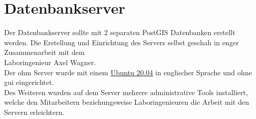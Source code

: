 \chapter{Datenbankserver}
Der Datenbankserver sollte mit 2 separaten PostGIS\cite{postgis:manual} Datenbanken erstellt werden. Die Erstellung und Einrichtung des Servers selbst geschah in enger Zusammenarbeit mit dem \\
Laboringenieur Axel Wagner.\\
Der \gls{ohm} Server wurde mit einem \href{https://releases.ubuntu.com/20.04/}{\underline{Ubuntu 20.04}} in englischer Sprache und ohne \gls{gui} eingerichtet.\\
Des Weiteren wurden auf dem Server mehrere administrative Tools installiert, welche den Mitarbeitern beziehungsweise Laboringenieuren die Arbeit mit den Servern erleichtern.
